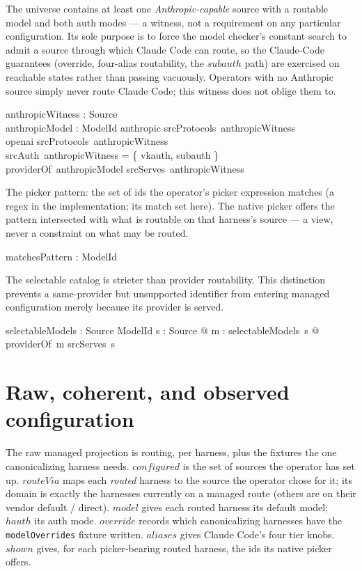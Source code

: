 \documentclass{article}
\begin{document}
The universe contains at least one \emph{Anthropic-capable} source with a
routable model and both auth modes --- a witness, not a requirement on any
particular configuration. Its sole purpose is to force the model checker's
constant search to admit a source through which Claude Code can route, so the
Claude-Code guarantees (override, four-alias routability, the $subauth$ path) are
exercised on reachable states rather than passing vacuously. Operators with no
Anthropic source simply never route Claude Code; this witness does not oblige
them to.

\begin{axdef}
	anthropicWitness : Source \\
	anthropicModel : ModelId
	\where
	anthropic \in srcProtocols~anthropicWitness \\
	openai \in srcProtocols~anthropicWitness \\
	srcAuth~anthropicWitness = \{ vkauth, subauth \} \\
	providerOf~anthropicModel \in srcServes~anthropicWitness
\end{axdef}

The picker pattern: the set of ids the operator's picker expression matches (a
regex in the implementation; its match set here). The native picker offers the
pattern intersected with what is routable on that harness's source --- a view,
never a constraint on what may be routed.

\begin{axdef}
	matchesPattern : \power ModelId
\end{axdef}

The selectable catalog is stricter than provider routability.  This distinction
prevents a same-provider but unsupported identifier from entering managed
configuration merely because its provider is served.

\begin{axdef}
	selectableModels : Source \fun \power ModelId
	\where
	\forall s : Source @ \forall m : selectableModels~s @
	providerOf~m \in srcServes~s
\end{axdef}

\section{Raw, coherent, and observed configuration}

The raw managed projection is routing, per harness, plus the fixtures the one
canonicalizing harness needs. $configured$ is the set of sources the operator
has set up. $routeVia$ maps each \emph{routed} harness to the source the operator
chose for it; its domain is exactly the harnesses currently on a managed route
(others are on their vendor default / direct). $model$ gives each routed
harness its default model; $hauth$ its auth mode. $override$ records which
canonicalizing harnesses have the \texttt{modelOverrides} fixture written.
$aliases$ gives Claude Code's four tier knobs. $shown$ gives, for each
picker-bearing routed harness, the ids its native picker offers.
\end{document}
